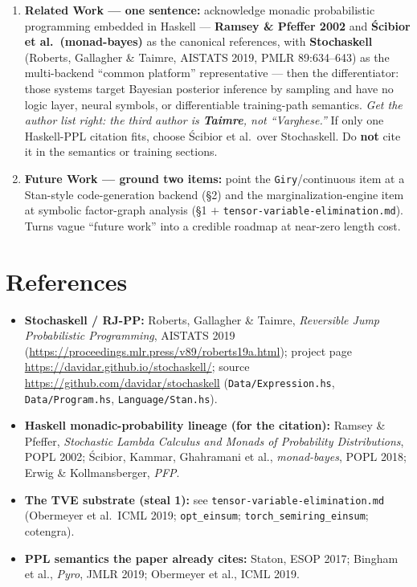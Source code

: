 \documentclass[11pt]{article}
\newcommand{\code}[1]{\texttt{#1}}
\begin{document}
\begin{enumerate}
  \item \textbf{Related Work --- one sentence:} acknowledge monadic probabilistic programming embedded
        in Haskell --- \textbf{Ramsey \& Pfeffer 2002} and \textbf{\'Scibior et al.\ (monad-bayes)} as
        the canonical references, with \textbf{Stochaskell} (Roberts, Gallagher \& Taimre, AISTATS 2019,
        PMLR 89:634--643) as the multi-backend ``common platform'' representative --- then the
        differentiator: those systems target Bayesian posterior inference by sampling and have no logic
        layer, neural symbols, or differentiable training-path semantics. \emph{Get the author list
        right: the third author is \textbf{Taimre}, not ``Varghese.''} If only one Haskell-PPL citation
        fits, choose \'Scibior et al.\ over Stochaskell. Do \textbf{not} cite it in the semantics or
        training sections.
  \item \textbf{Future Work --- ground two items:} point the \code{Giry}/continuous item at a Stan-style
        code-generation backend (\S2) and the marginalization-engine item at symbolic factor-graph
        analysis (\S1 $+$ \code{tensor-variable-elimination.md}). Turns vague ``future work'' into a
        credible roadmap at near-zero length cost.
\end{enumerate}

\section*{References}

\begin{itemize}
  \item \textbf{Stochaskell / RJ-PP:} Roberts, Gallagher \& Taimre, \emph{Reversible Jump Probabilistic
        Programming}, AISTATS 2019 (\url{https://proceedings.mlr.press/v89/roberts19a.html}); project
        page \url{https://davidar.github.io/stochaskell/}; source
        \url{https://github.com/davidar/stochaskell} (\code{Data/Expression.hs}, \code{Data/Program.hs},
        \code{Language/Stan.hs}).
  \item \textbf{Haskell monadic-probability lineage (for the citation):} Ramsey \& Pfeffer,
        \emph{Stochastic Lambda Calculus and Monads of Probability Distributions}, POPL 2002; \'Scibior,
        Kammar, Ghahramani et al., \emph{monad-bayes}, POPL 2018; Erwig \& Kollmansberger, \emph{PFP}.
  \item \textbf{The TVE substrate (steal 1):} see \code{tensor-variable-elimination.md} (Obermeyer et
        al.\ ICML 2019; \code{opt\_einsum}; \code{torch\_semiring\_einsum}; cotengra).
  \item \textbf{PPL semantics the paper already cites:} Staton, ESOP 2017; Bingham et al., \emph{Pyro},
        JMLR 2019; Obermeyer et al., ICML 2019.
\end{itemize}
\end{document}
